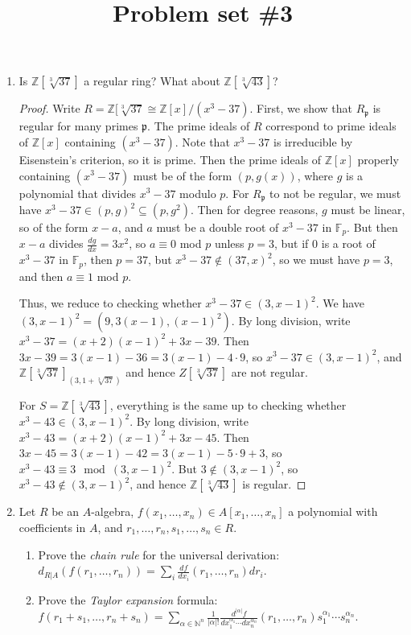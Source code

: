 \documentclass{amsart}[12pt]
\title{Problem set \#3}
\newcommand{\F}{\mathbb{F}}
\newcommand{\Z}{\mathbb{Z}}
\newcommand{\N}{\mathbb{N}}
\newcommand{\fp}{{\mathfrak p}}
\numberwithin{equation}{section}
\theoremstyle{plain} %
\theoremstyle{definition}
\theoremstyle{remark}
\begin{document}
\onehalfspacing

\maketitle


\vspace{-1mm}

\begin{enumerate}


\item  Is $\Z[\sqrt[3]{37}]$ a regular ring? What about $\Z[\sqrt[3]{43}]$?

\begin{proof} Write $R= \Z[\sqrt[3]{37} \cong \Z[x]/(x^3-37)$. First, we show that $R_\fp$ is regular for many primes $\fp$. The prime ideals of $R$ correspond to prime ideals of $\Z[x]$ containing $(x^3-37)$. Note that $x^3-37$ is irreducible by Eisenstein's criterion, so it is prime. Then the prime ideals of $\Z[x]$ properly containing $(x^3-37)$ must be of the form $(p,g(x))$, where $g$ is a polynomial that divides $x^3-37$ modulo $p$. For $R_\fp$ to not be regular, we must have $x^3-37 \in (p,g)^2 \subseteq (p,g^2)$. Then for degree reasons, $g$ must be linear, so of the form $x-a$, and $a$ must be a double root of $x^3-37$ in $\F_p$. But then $x-a$ divides $\frac{dg}{dx} = 3x^2$, so $a\equiv 0$ mod $p$ unless $p=3$, but if $0$ is a root of $x^3-37$ in $\F_p$, then $p=37$, but $x^3-37 \notin (37,x)^2$, so we must have $p=3$, and then $a\equiv 1$ mod $p$. 

Thus, we reduce to checking whether $x^3-37\in (3,x-1)^2$. We have $(3,x-1)^2= (9, 3(x-1), (x-1)^2)$. By long division, write $x^3-37 = (x+2)(x-1)^2 + 3x-39$. Then $3x-39 = 3(x-1) - 36 = 3(x-1) - 4\cdot 9$, so $x^3-37\in (3,x-1)^2$, and $\Z[\sqrt[3]{37}]_{(3,1+\sqrt[3]{37})}$ and hence $Z[\sqrt[3]{37}]$ are not regular.

For $S=\Z[\sqrt[3]{43}]$, everything is the same up to checking whether $x^3-43\in (3,x-1)^2$. By long division, write 
$x^3-43 = (x+2)(x-1)^2 + 3x-45$. Then $3x-45 = 3(x-1) - 42 = 3(x-1) - 5\cdot 9 + 3$, so $x^3-43\equiv 3 \mod (3,x-1)^2$. But $3\notin (3,x-1)^2$, so $x^3-43\notin (3,x-1)^2$, and hence $\Z[\sqrt[3]{43}]$ is regular.
\end{proof}

\item Let $R$ be an $A$-algebra, $f(x_1,\dots,x_n) \in A[x_1,\dots,x_n]$ a polynomial with coefficients in $A$, and $r_1,\dots,r_n, s_1,\dots,s_n\in R$.
\begin{enumerate}
\item Prove the \emph{chain rule} for the universal derivation: $d_{R|A}(f(r_1,\dots,r_n)) = \sum_i \frac{d f}{d x_i}(r_1,\dots,r_n) dr_i$.
\item Prove the \emph{Taylor expansion} formula: $f(r_1+s_1,\dots,r_n+s_n) = \sum_{\alpha \in \N^n} \frac{1}{|\alpha|!} \frac{d^{|\alpha|}f}{dx_1^{\alpha_1} \cdots dx_n^{\alpha_n}}(r_1,\dots,r_n) s_1^{\alpha_1} \cdots s_n^{\alpha_n}$.
\end{enumerate}


\end{enumerate}
\end{document}
